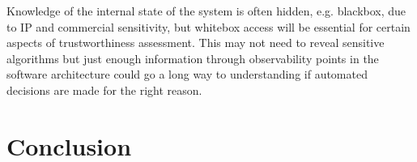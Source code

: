Knowledge of the internal state of the system is often hidden, e.g. blackbox, due to IP and commercial sensitivity, but whitebox access will be essential for certain aspects of trustworthiness assessment. This may not need to reveal sensitive algorithms but just enough information through observability points in the software architecture could go a long way to understanding if automated decisions are made for the right reason\cite{koopman2018toward}. 



\section{Conclusion}\label{conclusion}
